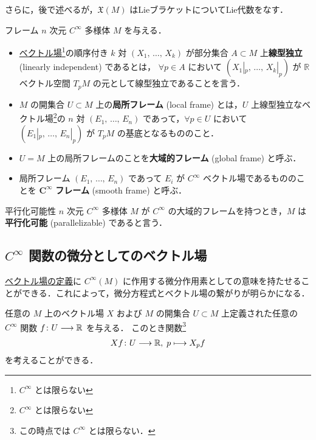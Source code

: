 \documentclass[geometry_main]{subfiles}
\begin{document}
さらに，後で述べるが，$\mathfrak{X}(M)$ はLieブラケットについてLie代数をなす．

\begin{mydef}[label=def:smoothframe]{フレーム}
    $n$ 次元 $C^\infty$ 多様体 $M$ を与える．
    \begin{itemize}
        \item \hyperref[def:vecf]{ベクトル場}\footnote{$C^\infty$ とは限らない}の順序付き $k$ 対 $(X_1,\, \dots,\, X_k)$ が部分集合 $A \subset M$ 上\textbf{線型独立} (linearly independent) であるとは， $\forall p \in A$ において $(X_1|_p,\, \dots,\, X_k|_p)$ が $\mathbb{R}$ ベクトル空間 $T_p M$ の元として線型独立であることを言う．
        \item $M$ の開集合 $U \subset M$ 上の\textbf{局所フレーム} (local frame) とは，$U$ 上線型独立なベクトル場\footnote{$C^\infty$ とは限らない}の $n$ 対 $(E_1,\, \dots,\, E_n)$ であって，$\forall p \in U$ において $(E_1|_p,\, \dots,\, E_n|_p)$ が $T_p M$ の基底となるもののこと．
        \item $U = M$ 上の局所フレームのことを\textbf{大域的フレーム} (global frame) と呼ぶ．
        \item 局所フレーム  $(E_1,\, \dots,\, E_n)$ であって $E_i$ が $C^\infty$ ベクトル場であるもののことを $\bm{C^\infty}$ \textbf{フレーム} (smooth frame) と呼ぶ．
    \end{itemize}
\end{mydef}

\begin{mydef}[label=def:parallel]{平行化可能性}
    $n$ 次元 $C^\infty$ 多様体 $M$ が $C^\infty$ の大域的フレームを持つとき，$M$ は\textbf{平行化可能} (parallelizable) であると言う．
\end{mydef}


\subsection{$C^\infty$ 関数の微分としてのベクトル場}

\hyperref[def:vecf]{ベクトル場の定義}に $C^\infty (M)$ に作用する微分作用素としての意味を持たせることができる．これによって，微分方程式とベクトル場の繋がりが明らかになる．

任意の $M$ 上のベクトル場 $X$ および $M$ の開集合 $U \subset M$ 上定義された任意の $C^\infty$ 関数 $f \colon U \longrightarrow \mathbb{R}$ を与える．
このとき関数\footnote{この時点では $C^\infty$ とは限らない．}
\begin{align}
    Xf \colon U \longrightarrow \mathbb{R},\; p \longmapsto X_p f
\end{align}
を考えることができる．
\end{document}
